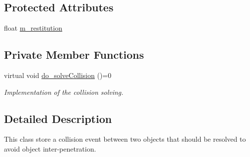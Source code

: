 \subsection*{Protected Attributes}
\begin{DoxyCompactItemize}
\item 
float \hyperlink{classCollision_a1158537ee89f6a5e1aab79f4ecd6a7d4}{m\+\_\+restitution}
\end{DoxyCompactItemize}
\subsection*{Private Member Functions}
\begin{DoxyCompactItemize}
\item 
virtual void \hyperlink{classCollision_a5fa2b29df51abd8723660cd07050e616}{do\+\_\+solve\+Collision} ()=0
\begin{DoxyCompactList}\small\item\em Implementation of the collision solving. \end{DoxyCompactList}\end{DoxyCompactItemize}


\subsection{Detailed Description}
This class store a collision event between two objects that should be resolved to avoid object inter-\/penetration. 

